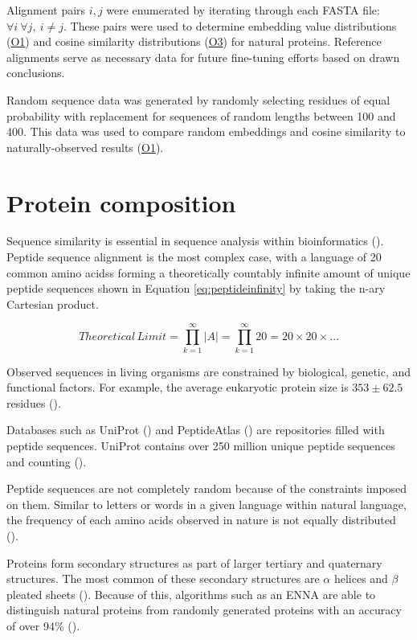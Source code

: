 \noindent Alignment pairs \(i, j\) were enumerated by iterating through each FASTA file: \(\forall i~\forall j, ~i \ne j\). These pairs were used to determine embedding value distributions (\hyperlink{O1}{O1}) and cosine similarity distributions (\hyperlink{O3}{O3})  for natural proteins. Reference alignments serve as necessary data for future fine-tuning efforts based on drawn conclusions.

Random sequence data was generated by randomly selecting \glspl{residue} of equal probability with replacement for sequences of random lengths between 100 and 400. This data was used to compare random embeddings and cosine similarity to naturally-observed results (\hyperlink{O1}{O1}).

\section{Protein composition}

Sequence similarity is essential in sequence analysis within bioinformatics (\cite{Ofer:2021}). Peptide sequence alignment is the most complex case, with a language of 20 common \glspl{amino acids} forming a theoretically countably infinite amount of unique \gls{peptide} sequences shown in Equation \ref{eq:peptideinfinity} by taking the n-ary Cartesian product.

\begin{equation}
    {Theoretical\, Limit} = \prod_{k=1}^{\infty} |A| = \prod_{k=1}^{\infty} 20 = 20 \times 20 \times \ldots
    \label{eq:peptideinfinity}
\end{equation}

Observed sequences in living organisms are constrained by biological, genetic, and functional factors. For example, the average eukaryotic protein size is $353 \pm 62.5$ \glspl{residue} (\cite{Nevers:2023}). 

Databases such as UniProt (\cite{UniProt:2023}) and PeptideAtlas (\cite{PeptideAtlas:2006}) are repositories filled with \gls{peptide} sequences. UniProt contains over 250 million unique peptide sequences and counting (\cite{UniProt:2023}).

Peptide sequences are not completely random because of the constraints imposed on them. Similar to letters or words in a given language within natural language, the frequency of each \gls{amino acids} observed in nature is not equally distributed (\cite{Beals:1999}).

Proteins form secondary structures as part of larger tertiary and quaternary structures. The most common of these secondary structures are \(\alpha\) helices and \(\beta\) pleated sheets (\cite{Ma:2018}). Because of this, algorithms such as an \gls{ENNA} are able to distinguish natural proteins from randomly generated proteins with an accuracy of over 94\% (\cite{Lucrezia:2012}).

